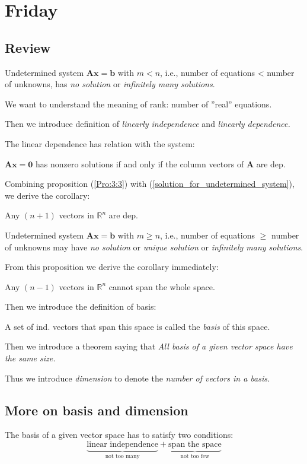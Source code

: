 
\section{Friday}
\subsection{Review}
\begin{proposition}\label{solution_for_undetermined_system}
Undetermined system $\bm{Ax} = \bm b$ with $m<n$, i.e., number of equations < number of unknowns, has \emph{no solution} or \emph{infinitely many solutions}.
\end{proposition}
We want to understand the meaning of rank: number of ''real'' equations. 

Then we introduce definition of \textit{linearly independence} and \textit{linearly dependence.}

The linear dependence has relation with the system:
\begin{proposition}\label{Pro:3:3}
$\bm{Ax} = \bm 0$ has nonzero solutions if and only if the column vectors of $\bm A$ are dep.
\end{proposition}
Combining proposition (\ref{Pro:3:3}) with (\ref{solution_for_undetermined_system}), 
we derive the corollary:
\begin{corollary}
Any $(n+1)$ vectors in $\mathbb{R}^{n}$ are dep.
\end{corollary}
\begin{proposition}
Undetermined system $\bm{Ax} = \bm b$ with $m\ge n$, i.e., number of equations $\ge$ number of unknowns may have \emph{no solution} or \emph{unique solution} or \emph{infinitely many solutions}.
\end{proposition}
From this proposition we derive the corollary immediately:
\begin{corollary}
Any $(n-1)$ vectors in $\mathbb{R}^{n}$ cannot span the whole space.
\end{corollary}
Then we introduce the definition of basis:
\begin{definition}[Basis]
A set of ind. vectors that span this space is called the \emph{basis} of this space.
\end{definition}
Then we introduce a theorem saying that \emph{All basis of a given vector space have the same size.}

Thus we introduce \emph{dimension} to denote the \textit{number of vectors in a basis.}
\subsection{More on basis and dimension}
The basis of a given vector space has to satisfy two conditions:
\[
\underbrace{\mbox{linear independence}}_{\mbox{not too many}} + 
\underbrace{\mbox{span the space}}_{\mbox{not too few}}
\]

